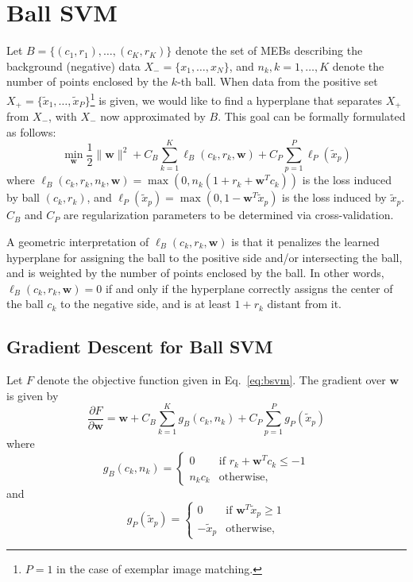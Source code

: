 \documentclass[12pt]{article}
\newcommand{\bw}{\mathbf{w}}
\newcommand{\tx}{\tilde{x}}
\begin{document}
\section{Ball SVM}
Let $B = \{ (c_1, r_1), \ldots, (c_K, r_K) \}$ denote the set of MEBs describing the background (negative) data $X_- = \{x_1, \ldots, x_N \}$, and $n_k, k = 1, \ldots, K$ denote the number of points enclosed by the $k$-th ball. When data from the positive set $X_+ = \{\tx_1, \ldots, \tx_P \}$\footnote{$P=1$ in the case of exemplar image matching.} is given, we would like to find a hyperplane that separates $X_+$ from $X_-$, with $X_-$ now approximated by $B$. This goal can be formally formulated as follows:
\begin{equation}
\min_\bw \frac{1}{2}\|\bw \|^2 + C_B\sum_{k = 1}^K \ell_B(c_k, r_k, \bw) + C_P\sum_{p=1}^P \ell_P(\tx_p)
\label{eq:bsvm}
\end{equation}
where $\ell_B(c_k, r_k, n_k, \bw) = \max(0, n_k (1 + r_k  + \bw^Tc_k))$ is the loss induced by ball $(c_k, r_k)$, and $\ell_P(\tx_p) = \max(0, 1 - \bw^T\tx_p)$ is the loss induced by $\tx_p$. $C_B$ and $C_P$ are regularization parameters to be determined via cross-validation.

A geometric interpretation of $\ell_B(c_k, r_k, \bw)$ is that it penalizes the learned hyperplane for assigning the ball to the positive side and/or intersecting the ball, and is weighted by the number of points enclosed by the ball. In other words, $\ell_B(c_k, r_k, \bw) = 0$ if and only if the hyperplane correctly assigns the center of the ball $c_k$ to the negative side, and is at least $1+r_k$ distant from it.

\subsection{Gradient Descent for Ball SVM}
Let $F$ denote the objective function given in Eq.~\ref{eq:bsvm}. The gradient over $\bw$ is given by
$$
\frac{\partial F}{\partial \bw} = \bw + C_B\sum_{k=1}^K g_B(c_k, n_k) + C_P\sum_{p=1}^P g_P(\tx_p)
$$
where
$$
g_B(c_k, n_k) = 
  \begin{cases}
   0 & \text{if } r_k + \bw^Tc_k \le -1  \\
   n_kc_k & \text{otherwise},
  \end{cases}
$$
and
$$
g_P(\tx_p) = 
  \begin{cases}
   0 & \text{if } \bw^T\tx_p \ge 1  \\
   -\tx_p & \text{otherwise},
  \end{cases}
$$
\end{document}
